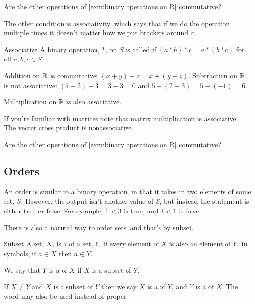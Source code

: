 \documentclass[fleqn]{LectureClass/LectureClass}
\begin{document}
    \begin{problem}{}{}
        Are the other operations of \cref{exm:binary operations on R} commutative?
    \end{problem}
    
    The other condition is associativity, which says that if we do the operation multiple times it doesn't matter how we put brackets around it.
    
    \begin{dfn}{Associative}{}
        A binary operation, \(*\), on \(S\) is called  if \((a * b) * c = a * (b * c)\) for all \(a, b, c \in S\).
    \end{dfn}
    
    \begin{exm}{}{}
        Addition on \(\mathbb{R}\) is commutative: \((x + y) + z = x + (y + z)\).
        Subtraction on \(\mathbb{R}\) is not associative: \((5 - 2) - 3 = 3 - 3 = 0\) and \(5 - (2 - 3) = 5 - (-1) = 6\).
        
        Multiplication on \(\mathbb{R}\) is also associative.
        
        If you're familiar with matrices note that matrix multiplication is associative.
        The vector cross product is nonassociative.
    \end{exm}
    
    \begin{problem}{}{}
        Are the other operations of \cref{exm:binary operations on R} commutative?
    \end{problem}
    
    \subsection{Orders}
    An order is similar to a binary operation, in that it takes in two elements of some set, \(S\).
    However, the output isn't another value of \(S\), but instead the statement is either true or false.
    For example, \(1 < 3\) is true, and \(3 < 1\) is false.
    
    There is also a natural way to order sets, and that's by subset.
    
    \begin{dfn}{Subset}{}
        A set, \(X\), is a  of a set, \(Y\), if every element of \(X\) is also an element of \(Y\).
        In symbols, if \(a \in X\) then \(a \in Y\).
        
        We say that \(Y\) is a  of \(X\) if \(X\) is a subset of \(Y\).
        
        If \(X \ne Y\) and \(X\) is a subset of \(Y\) then we say \(X\) is a  of \(Y\), and \(Y\) is a  of \(X\).
        The word  may also be used instead of proper.
    \end{dfn}
    
\end{document}
